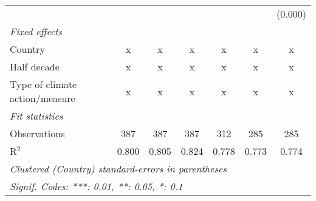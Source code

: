 \begin{tabular}{lcccccc}
                                                       &         &              &                &                &                & (0.000)\\   
   \emph{Fixed effects}\\
   Country                                             & x       & x            & x              & x              & x              & x\\  
   Half decade                                         & x       & x            & x              & x              & x              & x\\  
   Type of climate action/measure                      & x       & x            & x              & x              & x              & x\\  
   \midrule \emph{Fit statistics}\\
   Observations                                        & 387     & 387          & 387            & 312            & 285            & 285\\  
   R$^2$                                               & 0.800   & 0.805        & 0.824          & 0.778          & 0.773          & 0.774\\  
   \midrule
   \multicolumn{7}{l}{\emph{Clustered (Country) standard-errors in parentheses}}\\
   \multicolumn{7}{l}{\emph{Signif. Codes: ***: 0.01, **: 0.05, *: 0.1}}\\
\end{tabular}
\par\endgroup


